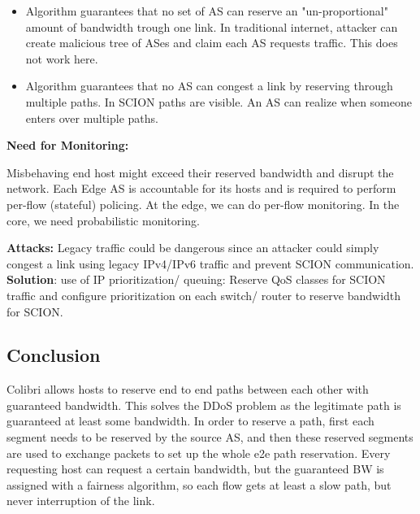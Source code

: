 \documentclass[11pt,oneside,a4paper]{article}
\begin{document}
\vspace{-\topsep}
\begin{itemize}
	\setlength{\itemsep}{0pt}
	\setlength{\parskip}{0pt}
	\item Algorithm guarantees that no set of AS can reserve an "un-proportional" amount of bandwidth trough one link. In traditional internet, attacker can create malicious tree of ASes and claim each AS requests traffic. This does not work here.
	\item Algorithm guarantees that no AS can congest a link by reserving through multiple paths. In SCION paths are visible. An AS can realize when someone enters over multiple paths.
\end{itemize}
\vspace{-\topsep}

\noindent \textbf{Need for Monitoring:}

\noindent Misbehaving end host might exceed their reserved bandwidth and disrupt the network. Each Edge AS is accountable for its hosts and is required to perform per-flow (stateful) policing. At the edge, we can do per-flow monitoring. In the core, we need probabilistic monitoring.

\newpage

\noindent \textbf{Attacks:} Legacy traffic could be dangerous since an attacker could simply congest a link using legacy IPv4/IPv6 traffic and prevent SCION communication.\\
\noindent \textbf{Solution}: use of IP prioritization/ queuing: Reserve QoS classes for SCION traffic and configure prioritization on each switch/ router to reserve bandwidth for SCION.

\subsection{Conclusion}

Colibri allows hosts to reserve end to end paths between each other with guaranteed bandwidth. This solves the DDoS problem as the legitimate path is guaranteed at least some bandwidth. In order to reserve a path, first each segment needs to be reserved by the source AS, and then these reserved segments are used to exchange packets to set up the whole e2e path reservation. Every requesting host can request a certain bandwidth, but the guaranteed BW is assigned with a fairness algorithm, so each flow gets at least a slow path, but never interruption of the link.
\end{document}

